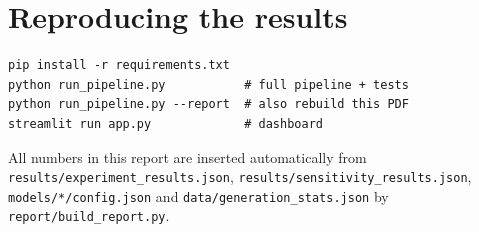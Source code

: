 \documentclass[11pt,a4paper]{article}
\begin{document}
\appendix
\section{Reproducing the results}
\begin{verbatim}
pip install -r requirements.txt
python run_pipeline.py           # full pipeline + tests
python run_pipeline.py --report  # also rebuild this PDF
streamlit run app.py             # dashboard
\end{verbatim}
All numbers in this report are inserted automatically from \texttt{results/experiment\_results.json},
\texttt{results/sensitivity\_results.json}, \texttt{models/*/config.json} and \texttt{data/generation\_stats.json} by
\texttt{report/build\_report.py}.
\end{document}
